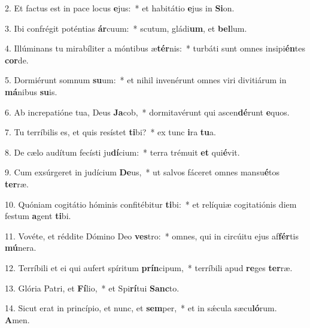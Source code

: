 2. Et factus est in pace locus \textbf{e}jus:~*  et habitátio \textbf{e}jus in \textbf{Si}on.\

3. Ibi confrégit poténtias \textbf{ár}cuum:~*  scutum, gládi\textbf{um}, et \textbf{bel}lum.\

4. Illúminans tu mirabíliter a móntibus æ\textbf{tér}nis:~*  turbáti sunt omnes insipi\textbf{én}tes \textbf{cor}de.\

5. Dormiérunt somnum \textbf{su}um:~*  et nihil invenérunt omnes viri divitiárum in \textbf{má}nibus \textbf{su}is.\

6. Ab increpatióne tua, Deus \textbf{Ja}cob,~*  dormitavérunt qui ascen\textbf{dé}runt \textbf{e}quos.\

7. Tu terríbilis es, et quis resístet \textbf{ti}bi?~*  ex tunc \textbf{i}ra \textbf{tu}a.\

8. De cælo audítum fecísti ju\textbf{dí}cium:~*  terra trémuit \textbf{et} qui\textbf{é}vit.\

9. Cum exsúrgeret in judícium \textbf{De}us,~*  ut salvos fáceret omnes mansu\textbf{é}tos \textbf{ter}ræ.\

10. Quóniam cogitátio hóminis confitébitur \textbf{ti}bi:~*  et relíquiæ cogitatiónis diem festum \textbf{a}gent \textbf{ti}bi.\

11. Vovéte, et réddite Dómino Deo \textbf{ves}tro:~*  omnes, qui in circúitu ejus af\textbf{fér}tis \textbf{mú}nera.\

12. Terríbili et ei qui aufert spíritum \textbf{prín}cipum,~*  terríbili apud \textbf{re}ges \textbf{ter}ræ.\

13. Glória Patri, et \textbf{Fí}lio,~*  et Spi\textbf{rí}tui \textbf{Sanc}to.\

14. Sicut erat in princípio, et nunc, et \textbf{sem}per,~*  et in sǽcula sæcu\textbf{ló}rum. \textbf{A}men.\


